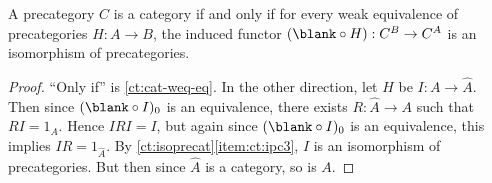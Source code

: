 %
\begin{thm}\label{ct:weq-iso-precat-cat}
  A precategory $C$ is a category if and only if for every weak equivalence of precategories $H:A\to B$, the induced functor $(\blank\circ H):C^B \to C^A$ is an isomorphism of precategories.
\end{thm}

\begin{proof}
  ``Only if'' is \cref{ct:cat-weq-eq}.
  In the other direction, let $H$ be $I:A\to\widehat A$.
  Then since $(\blank\circ I)_0$ is an equivalence, there exists $R:\widehat A\to A$ such that $RI=1_A$.
  Hence $IRI=I$, but again since $(\blank\circ I)_0$ is an equivalence, this implies $IR =1_{\widehat A}$.
  By \cref{ct:isoprecat}\ref{item:ct:ipc3}, $I$ is an isomorphism of precategories.
  But then since $\widehat A$ is a category, so is $A$.
\end{proof}
